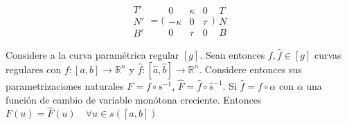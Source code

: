 \[
  \begin{array}{c}
    T' \\
    N' \\
    B' 
  \end{array} = 
  \Big(\begin{array}{ccc}
    0 & \kappa & 0 \\
    -\kappa & 0 & \tau \\
    0 & \tau & 0
  \end{array} \Big)
  \begin{array}{c}
    T \\
    N \\
    B 
  \end{array}
\]
\begin{proposition*}
  Considere a la curva paramétrica regular $[g]$. Sean entonces $f ,\hat{f} \in
  [g]$ curvas regulares con $f:[a,b] \to \mathbb{R}^n$ y
  $\hat{f}:[\hat{a},\hat{b}] \to \mathbb{R}^n$. Considere entonces sus
  parametrizaciones naturales $F = f \circ s^{-1}$, $\hat{F} = \hat{f} \circ
  \hat{s}^{-1}$. Si $\hat{f} = f \circ \alpha$ con $\alpha$ una función de
  cambio de variable monótona creciente. Entonces $F(u)
  = \hat{F}(u) \quad \forall u \in s([a,b])$
\end{proposition*}

